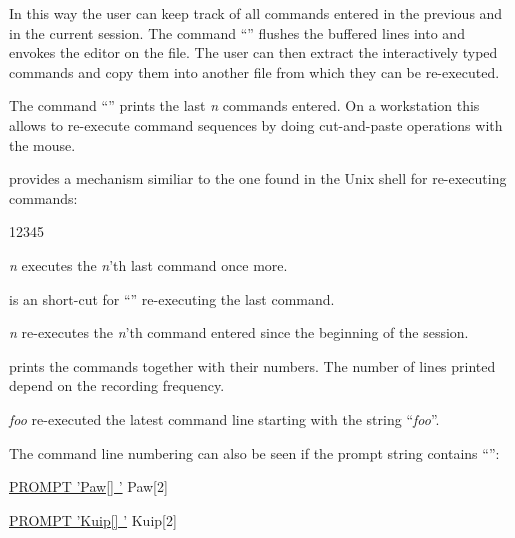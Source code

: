 In this way the user can keep track of all commands entered in
the previous and in the current session.
The command ``'' flushes the buffered lines into
 and envokes the editor on the file.
The user can then extract the interactively typed commands and copy
them into another  file from which they can be
re-executed.

The command ``'' prints the last \textsl{n}
commands entered.
On a workstation this allows to re-execute command sequences by doing
cut-and-paste operations with the mouse.

\KUIP{} provides a mechanism similiar to the one found
in the Unix  shell for re-executing commands:
\begin{DLtt}{12345}
\item[\Lit{!-}\textsl{n}]
executes the \textsl{n}'th last command once more. 
\item[\Lit{!!}]
is an short-cut for ``'' re-executing the last command.
\item[\Lit{!}\textsl{n}]
re-executes the \textsl{n}'th command entered since the beginning of the
session.
\item[\Lit{!}]
prints the commands together with their numbers.
The number of lines printed depend on the recording frequency.
\item[\Lit{!}\textsl{foo}]
re-executed the latest command line starting with the string ``\textsl{foo}''.
\end{DLtt}

The command line numbering can also be seen if the prompt string
contains ``\Lit{[]}'':
\ifPAWman
\begin{XMP}
\PROMPT{} \underline{PROMPT 'Paw[] '}
\vspace{-.8\baselineskip}
Paw[2]
\end{XMP}
\else
\begin{XMP}
\PROMPT{} \underline{PROMPT 'Kuip[] '}
\vspace{-.8\baselineskip}
Kuip[2]
\end{XMP}
\fi

